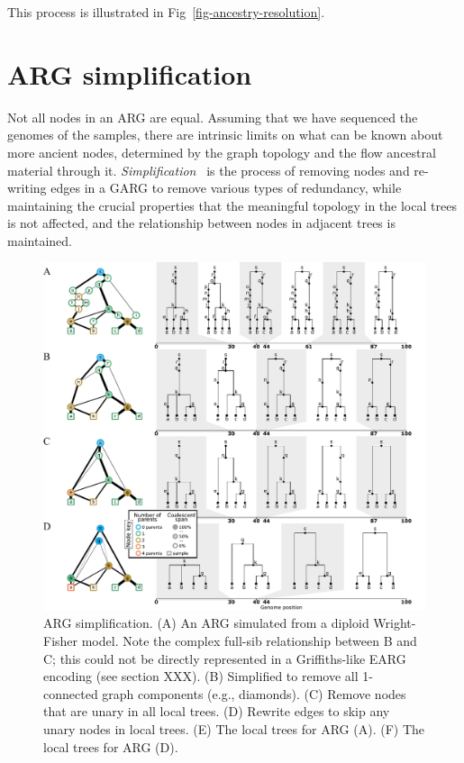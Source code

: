 \documentclass{article}
\begin{document}
This process is illustrated in Fig~\ref{fig-ancestry-resolution}.

\section*{ARG simplification}

Not all nodes in an ARG are equal. Assuming that we have sequenced the
genomes of the samples, there are intrinsic limits on what can
be known about more ancient nodes, determined by the graph topology
and the flow ancestral material through it.
\emph{Simplification}~\citep{kelleher2018efficient} is the process
of removing nodes and re-writing edges in a GARG to remove
various types of redundancy, while maintaining the crucial properties
that the meaningful topology in the local trees is not affected,
and the relationship between nodes in adjacent trees is maintained.

\begin{figure}
\centering
\vspace{5em}
\includegraphics[width=\linewidth]{illustrations/simplification}
\caption{\label{fig-simplification}
ARG simplification. (A) An ARG simulated from a diploid Wright-Fisher
model. Note the complex full-sib relationship between B and C; this
could not be directly represented in a Griffiths-like EARG encoding
(see section XXX).
(B) Simplified to remove all
1-connected graph components (e.g., diamonds).
(C) Remove nodes that are unary in all local trees.
(D) Rewrite edges to skip any unary nodes in local trees.
(E) The local trees for ARG (A).
(F) The local trees for ARG (D).
}
\end{figure}
\end{document}
